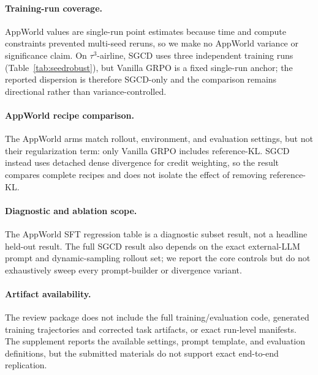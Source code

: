 \paragraph{Training-run coverage.} AppWorld values are single-run point estimates because time and compute constraints prevented multi-seed reruns, so we make no AppWorld variance or significance claim. On $\tau^3$-airline, SGCD uses three independent training runs (Table~\ref{tab:seedrobust}), but Vanilla GRPO is a fixed single-run anchor; the reported dispersion is therefore SGCD-only and the comparison remains directional rather than variance-controlled.

\paragraph{AppWorld recipe comparison.} The AppWorld arms match rollout,
environment, and evaluation settings, but not their regularization term:
only Vanilla GRPO includes reference-KL. SGCD instead uses detached dense
divergence for credit weighting, so the result compares complete recipes and
does not isolate the effect of removing reference-KL.

\paragraph{Diagnostic and ablation scope.} The AppWorld SFT regression table is
a diagnostic subset result, not a headline held-out result. The full SGCD result
also depends on the exact external-LLM prompt and dynamic-sampling rollout set;
we report the core controls but do not exhaustively sweep every prompt-builder
or divergence variant.

\paragraph{Artifact availability.} The review package does not include the full
training/evaluation code, generated training trajectories and corrected task
artifacts, or exact run-level manifests. The supplement reports the available
settings, prompt template, and evaluation definitions, but the submitted
materials do not support exact end-to-end replication.
